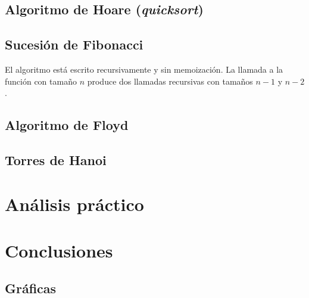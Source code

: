 \documentclass[a4paper, 11pt]{article} %
\begin{document}
\subsection{Algoritmo de Hoare (\textit{quicksort})}

\subsection {Sucesión de Fibonacci}
El algoritmo está escrito recursivamente y sin memoización. La llamada a la función con tamaño $n$ produce 
dos llamadas recursivas con tamaños $n-1$ y $n-2$.

\subsection{Algoritmo de Floyd}
\subsection{Torres de Hanoi}

\section {Análisis práctico}

\section {Conclusiones}
\subsection {Gráficas}
\end{document}
